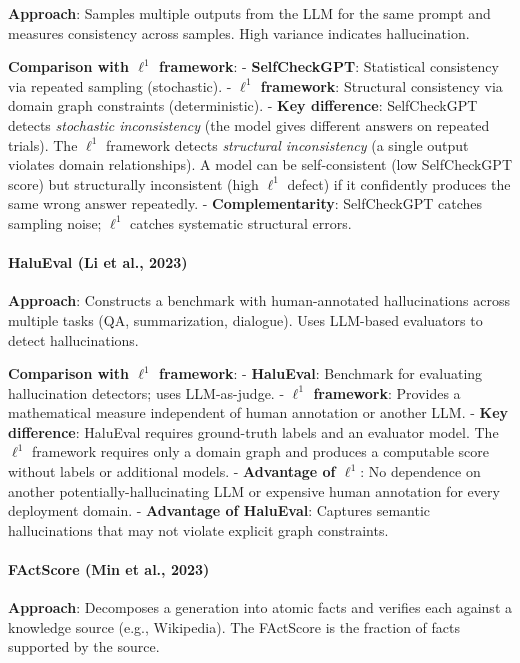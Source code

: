 \documentclass[
]{article}
\begin{document}
\textbf{Approach}: Samples multiple outputs from the LLM for the same
prompt and measures consistency across samples. High variance indicates
hallucination.

\textbf{Comparison with \(\ell^1\) framework}: - \textbf{SelfCheckGPT}:
Statistical consistency via repeated sampling (stochastic). -
\textbf{\(\ell^1\) framework}: Structural consistency via domain graph
constraints (deterministic). - \textbf{Key difference}: SelfCheckGPT
detects \emph{stochastic inconsistency} (the model gives different
answers on repeated trials). The \(\ell^1\) framework detects
\emph{structural inconsistency} (a single output violates domain
relationships). A model can be self-consistent (low SelfCheckGPT score)
but structurally inconsistent (high \(\ell^1\) defect) if it confidently
produces the same wrong answer repeatedly. - \textbf{Complementarity}:
SelfCheckGPT catches sampling noise; \(\ell^1\) catches systematic
structural errors.

\paragraph{HaluEval (Li et al., 2023)}\label{halueval-li-et-al.-2023}

\textbf{Approach}: Constructs a benchmark with human-annotated
hallucinations across multiple tasks (QA, summarization, dialogue). Uses
LLM-based evaluators to detect hallucinations.

\textbf{Comparison with \(\ell^1\) framework}: - \textbf{HaluEval}:
Benchmark for evaluating hallucination detectors; uses LLM-as-judge. -
\textbf{\(\ell^1\) framework}: Provides a mathematical measure
independent of human annotation or another LLM. - \textbf{Key
difference}: HaluEval requires ground-truth labels and an evaluator
model. The \(\ell^1\) framework requires only a domain graph and
produces a computable score without labels or additional models. -
\textbf{Advantage of \(\ell^1\)}: No dependence on another
potentially-hallucinating LLM or expensive human annotation for every
deployment domain. - \textbf{Advantage of HaluEval}: Captures semantic
hallucinations that may not violate explicit graph constraints.

\paragraph{FActScore (Min et al.,
2023)}\label{factscore-min-et-al.-2023}

\textbf{Approach}: Decomposes a generation into atomic facts and
verifies each against a knowledge source (e.g., Wikipedia). The
FActScore is the fraction of facts supported by the source.
\end{document}

